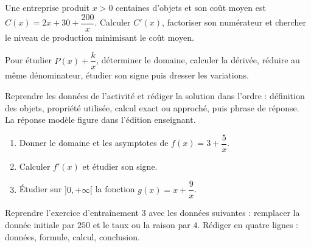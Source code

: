 \begin{activite}
Une entreprise produit $x>0$ centaines d'objets et son coût moyen est $C(x)=2x+30+\dfrac{200}{x}$. Calculer $C'(x)$, factoriser son numérateur et chercher le niveau de production minimisant le coût moyen.

\end{activite}

\begin{traceecrite}Pour étudier $P(x)+\dfrac{k}{x}$, déterminer le domaine, calculer la dérivée, réduire au même dénominateur, étudier son signe puis dresser les variations.\end{traceecrite}

\begin{exemple}
Reprendre les données de l'activité et rédiger la solution dans l'ordre : définition des objets, propriété utilisée, calcul exact ou approché, puis phrase de réponse. La réponse modèle figure dans l'édition enseignant.
\end{exemple}

\begin{exercice}[-- essentiel]
\begin{enumerate}\item Donner le domaine et les asymptotes de $f(x)=3+\dfrac{5}x$.\item Calculer $f'(x)$ et étudier son signe.\item Étudier sur $]0,+\infty[$ la fonction $g(x)=x+\dfrac{9}x$.\end{enumerate}
\end{exercice}


\begin{dm}Reprendre l'exercice d'entraînement 3 avec les données suivantes : remplacer la donnée initiale par $250$ et le taux ou la raison par $4$. Rédiger en quatre lignes : données, formule, calcul, conclusion.\end{dm}

